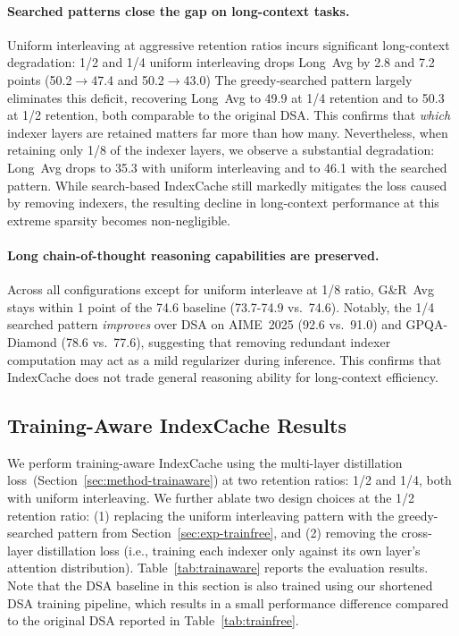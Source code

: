\paragraph{Searched patterns close the gap on long-context tasks.}
Uniform interleaving at aggressive retention ratios incurs significant long-context degradation: 1/2 and 1/4 uniform interleaving drops Long~Avg by 2.8 and 7.2 points (50.2$\to$47.4 and 50.2$\to$43.0)
The greedy-searched pattern largely eliminates this deficit, recovering Long~Avg to 49.9 at 1/4 retention and to 50.3 at 1/2 retention, both comparable to the original DSA.
This confirms that \emph{which} indexer layers are retained matters far more than how many.
Nevertheless, when retaining only 1/8 of the indexer layers, we observe a substantial degradation: Long~Avg drops to 35.3 with uniform interleaving and to 46.1 with the searched pattern. While search-based IndexCache still markedly mitigates the loss caused by removing indexers, the resulting decline in long-context performance at this extreme sparsity becomes non-negligible.


\paragraph{Long chain-of-thought reasoning capabilities are preserved.}
Across all configurations except for uniform interleave at 1/8 ratio, G\&R~Avg stays within 1 point of the 74.6 baseline (73.7-74.9 vs.\ 74.6).
Notably, the 1/4 searched pattern \emph{improves} over DSA on AIME~2025 (92.6 vs.\ 91.0) and GPQA-Diamond (78.6 vs.\ 77.6), suggesting that removing redundant indexer computation may act as a mild regularizer during inference.
This confirms that IndexCache does not trade general reasoning ability for long-context efficiency.

\subsection{Training-Aware IndexCache Results}
\label{sec:exp-trainaware}

We perform training-aware IndexCache using the multi-layer distillation loss~(Section~\ref{sec:method-trainaware}) at two retention ratios: 1/2 and 1/4, both with uniform interleaving.
We further ablate two design choices at the 1/2 retention ratio: (1) replacing the uniform interleaving pattern with the greedy-searched pattern from Section~\ref{sec:exp-trainfree}, and (2) removing the cross-layer distillation loss (i.e., training each indexer only against its own layer's attention distribution).
Table~\ref{tab:trainaware} reports the evaluation results.
Note that the DSA baseline in this section is also trained using our shortened DSA training pipeline, which results in a small performance difference compared to the original DSA reported in Table~\ref{tab:trainfree}. 

